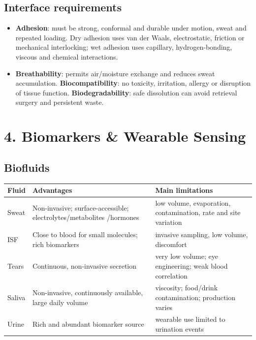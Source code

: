 \documentclass[10pt,a4paper]{ctexart}
\newcommand{\key}[1]{\textbf{#1}}
\begin{document}
\begin{multicols*}{3}
\subsection{Interface requirements}
\begin{itemize}
  \item \key{Adhesion}: must be strong, conformal and durable under motion,
  sweat and repeated loading. Dry adhesion uses van der Waals, electrostatic,
  friction or mechanical interlocking; wet adhesion uses capillary,
  hydrogen-bonding, viscous and chemical interactions.
  \item \key{Breathability}: permits air/moisture exchange and reduces sweat
  accumulation. \key{Biocompatibility}: no toxicity, irritation, allergy or
  disruption of tissue function. \key{Biodegradability}: safe dissolution
  can avoid retrieval surgery and persistent waste.
\end{itemize}

\section{4. Biomarkers \& Wearable Sensing}
\subsection{Biofluids}
\begin{center}\footnotesize
\begin{tabularx}{\linewidth}{@{}lYY@{}}
\toprule
Fluid & Advantages & Main limitations\\
\midrule
Sweat & Non-invasive; surface-accessible; electrolytes/metabolites \quad /hormones
& low volume, evaporation, contamination, rate and site variation\\
ISF & Close to blood for small molecules; rich biomarkers
& invasive sampling, low volume, discomfort\\
Tears & Continuous, non-invasive secretion
& very low volume; eye engineering; weak blood correlation\\
Saliva & Non-invasive, continuously available, large daily volume
& viscosity; food/drink contamination; production varies\\
Urine & Rich and abundant biomarker source
& wearable use limited to urination events\\
\bottomrule
\end{tabularx}
\end{center}


\end{multicols*}
\end{document}
